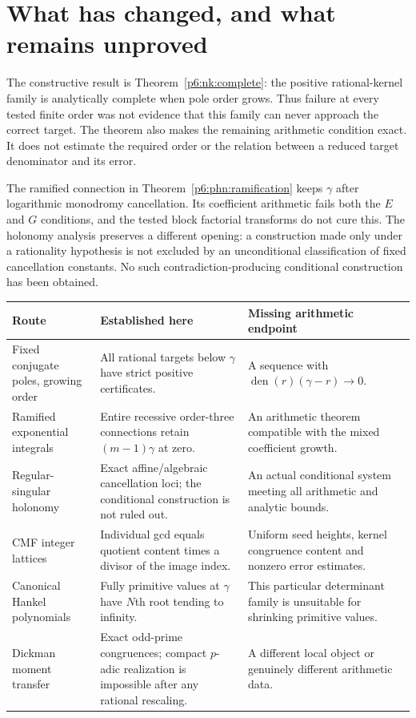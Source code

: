 \documentclass[11pt,a4paper]{article}
\theoremstyle{definition}
\theoremstyle{remark}
\numberwithin{equation}{section}
\begin{document}
\section{What has changed, and what remains unproved}

The constructive result is Theorem~\ref{p6:nk:complete}: the positive
rational-kernel family is analytically complete when pole order grows.
Thus failure at every tested finite order was not evidence that this
family can never approach the correct target. The theorem also makes
the remaining arithmetic condition exact. It does not estimate the
required order or the relation between a reduced target denominator
and its error.

The ramified connection in Theorem~\ref{p6:phn:ramification} keeps
$\gamma$ after logarithmic monodromy cancellation. Its coefficient
arithmetic fails both the $E$ and $G$ conditions, and the tested block
factorial transforms do not cure this. The holonomy analysis preserves
a different opening: a construction made only under a rationality
hypothesis is not excluded by an unconditional classification of
fixed cancellation constants. No such contradiction-producing
conditional construction has been obtained.

\begin{center}
\small
\begin{tabular}{@{}p{}p{}p{}@{}}
\toprule
Route & Established here & Missing arithmetic endpoint\\
\midrule
Fixed conjugate poles, growing order & All rational targets below
$\gamma$ have strict positive certificates. & A sequence with
$\operatorname{den}(r)(\gamma-r)\to0$.\\[4pt]
Ramified exponential integrals & Entire recessive order-three
connections retain $(m-1)\gamma$ at zero. & An arithmetic theorem
compatible with the mixed coefficient growth.\\[4pt]
Regular-singular holonomy & Exact affine/algebraic cancellation loci;
the conditional construction is not ruled out. & An actual conditional
system meeting all arithmetic and analytic bounds.\\[4pt]
CMF integer lattices & Individual gcd equals quotient content times
a divisor of the image index. & Uniform seed heights, kernel
congruence content and nonzero error estimates.\\[4pt]
Canonical Hankel polynomials & Fully primitive values at $\gamma$
have $N$th root tending to infinity. & This particular determinant
family is unsuitable for shrinking primitive values.\\[4pt]
Dickman moment transfer & Exact odd-prime congruences; compact
$p$-adic realization is impossible after any rational rescaling. &
A different local object or genuinely different arithmetic data.\\
\bottomrule
\end{tabular}
\end{center}
\end{document}
